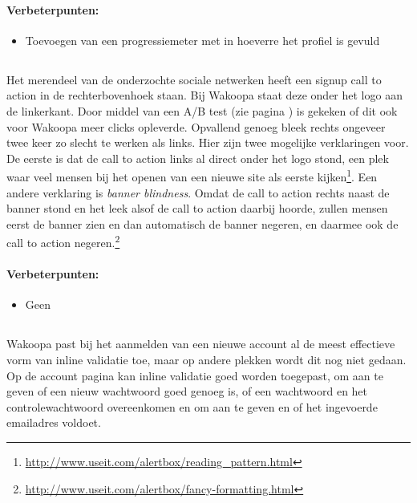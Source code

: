 \documentclass[a4paper, 10pt, pdftex]{report}
\begin{document}
      \paragraph{\textbf{Verbeterpunten:}}
      \begin{itemize}
        \item Toevoegen van een progressiemeter met in hoeverre het profiel is gevuld
      \end{itemize}

    \subsection{\cite{Editorial2008}}
    \label{wak:Editorial2008}
    Het merendeel van de onderzochte sociale netwerken heeft een signup call to action in de rechterbovenhoek staan. Bij Wakoopa staat deze onder het logo aan de linkerkant. Door middel van een A/B test (zie pagina \pageref{ctatest}) is gekeken of dit ook voor Wakoopa meer clicks opleverde. Opvallend genoeg bleek rechts ongeveer twee keer zo slecht te werken als links. Hier zijn twee mogelijke verklaringen voor. De eerste is dat de call to action links al direct onder het logo stond, een plek waar veel mensen bij het openen van een nieuwe site als eerste kijken\footnote{\url{http://www.useit.com/alertbox/reading\_pattern.html}}. Een andere verklaring is \emph{banner blindness}. Omdat de call to action rechts naast de banner stond en het leek alsof de call to action daarbij hoorde, zullen mensen eerst de banner zien en dan automatisch de banner negeren, en daarmee ook de call to action negeren.\footnote{\url{http://www.useit.com/alertbox/fancy-formatting.html}}

      \paragraph{\textbf{Verbeterpunten:}}
      \begin{itemize}
        \item Geen
      \end{itemize}

    \subsection{\cite{Wroblewski2009}}
    Wakoopa past bij het aanmelden van een nieuwe account al de meest effectieve vorm van inline validatie toe, maar op andere plekken wordt dit nog niet gedaan. Op de account pagina kan inline validatie goed worden toegepast, om aan te geven of een nieuw wachtwoord goed genoeg is, of een wachtwoord en het controlewachtwoord overeenkomen en om aan te geven en of het ingevoerde emailadres voldoet.
\end{document}
